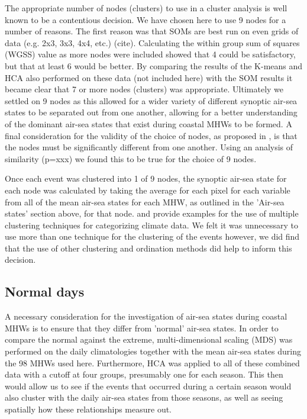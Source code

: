 \documentclass[a4paper,10pt,review]{elsarticle}
\begin{document}
The appropriate number of nodes (clusters) to use in a cluster analysis is well known to be a contentious decision. We have chosen here to use 9 nodes for a number of reasons. The first reason was that SOMs are best run on even grids of data (e.g. 2x3, 3x3, 4x4, etc.) (cite). Calculating the within group sum of squares (WGSS) value as more nodes were included showed that 4 could be satisfactory, but that at least 6 would be better. By comparing the results of the K-means and HCA also performed on these data (not included here) with the SOM results it became clear that 7 or more nodes (clusters) was appropriate. Ultimately we settled on 9 nodes as this allowed for a wider variety of different synoptic air-sea states to be separated out from one another, allowing for a better understanding of the dominant air-sea states that exist during coastal MHWs to be formed. A final consideration for the validity of the choice of nodes, as proposed in \citet{Johnson2013}, is that the nodes must be significantly different from one another. Using an analysis of similarity (p=xxx) we found this to be true for the choice of 9 nodes.

Once each event was clustered into 1 of 9 nodes, the synoptic air-sea state for each node was calculated by taking the average for each pixel for each variable from all of the mean air-sea states for each MHW, as outlined in the 'Air-sea states' section above, for that node. \citet{Ambroise2000} and \citet{Ramos2001} provide examples for the use of multiple clustering techniques for categorizing climate data. We felt it was unnecessary to use more than one technique for the clustering of the events however, we did find that the use of other clustering and ordination methods did help to inform this decision.

\subsection{Normal days}
A necessary consideration for the investigation of air-sea states during coastal MHWs is to ensure that they differ from 'normal' air-sea states. In order to compare the normal against the extreme, multi-dimensional scaling (MDS) was performed on the daily climatologies together with the mean air-sea states during the 98 MHWs used here. Furthermore, HCA was applied to all of these combined data with a cutoff at four groups, presumably one for each season. This then would allow us to see if the events that occurred during a certain season would also cluster with the daily air-sea states from those seasons, as well as seeing spatially how these relationships measure out.
\end{document}

